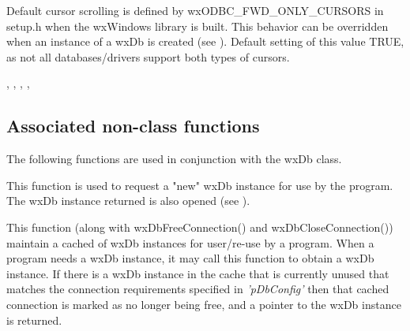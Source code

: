 



Default cursor scrolling is defined by wxODBC_FWD_ONLY_CURSORS in setup.h
when the wxWindows library is built.  This behavior can be overridden when 
an instance of a wxDb is created (see ).  
Default setting of this value TRUE, as not all databases/drivers support 
both types of cursors.


, , , , 

\subsection{Associated non-class functions}\label{wxdbfunctions}

The following functions are used in conjunction with the wxDb class.



This function is used to request a "new" wxDb instance for use by the program. 
The wxDb instance returned is also opened (see ).  

This function (along with wxDbFreeConnection() and wxDbCloseConnection()) 
maintain a cached of wxDb instances for user/re-use by a program.  When a 
program needs a wxDb instance, it may call this function to obtain a wxDb 
instance.  If there is a wxDb instance in the cache that is currently unused 
that matches the connection requirements specified in {\it'pDbConfig'} then 
that cached connection is marked as no longer being free, and a pointer to 
the wxDb instance is returned.

